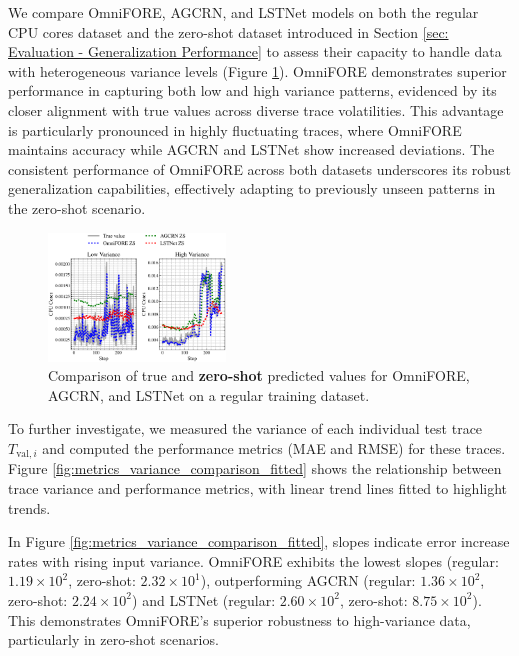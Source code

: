 \documentclass{ieeetmlcn}
\begin{document}
We compare OmniFORE, AGCRN, and LSTNet models on both the regular CPU cores dataset and the zero-shot dataset introduced in Section \ref{sec: Evaluation - Generalization Performance} to assess their capacity to handle data with heterogeneous variance levels (Figure \ref{fig:zs_sample_trace_comparison}). OmniFORE demonstrates superior performance in capturing both low and high variance patterns, evidenced by its closer alignment with true values across diverse trace volatilities. This advantage is particularly pronounced in highly fluctuating traces, where OmniFORE maintains accuracy while AGCRN and LSTNet show increased deviations. The consistent performance of OmniFORE across both datasets underscores its robust generalization capabilities, effectively adapting to previously unseen patterns in the zero-shot scenario. 

\begin{figure}%
\centering
\includegraphics[width=0.42\textwidth]{img/zs_sample_trace_comparison.eps}
\caption{Comparison of true and \textbf{zero-shot} predicted values for OmniFORE, AGCRN, and LSTNet on a regular training dataset.}
\label{fig:zs_sample_trace_comparison}
\end{figure}

To further investigate, we measured the variance of each individual test trace $T_{\text{val}, i}$ and computed the performance metrics (MAE and RMSE) for these traces. Figure \ref{fig:metrics_variance_comparison_fitted} shows the relationship between trace variance and performance metrics, with linear trend lines fitted to highlight trends.

In Figure \ref{fig:metrics_variance_comparison_fitted}, slopes indicate error increase rates with rising input variance. OmniFORE exhibits the lowest slopes (regular: $1.19 \times 10^2$, zero-shot: $2.32 \times 10^1$), outperforming AGCRN (regular: $1.36 \times 10^2$, zero-shot: $2.24 \times 10^2$) and LSTNet (regular: $2.60 \times 10^2$, zero-shot: $8.75 \times 10^2$). This demonstrates OmniFORE's superior robustness to high-variance data, particularly in zero-shot scenarios.
\end{document}
